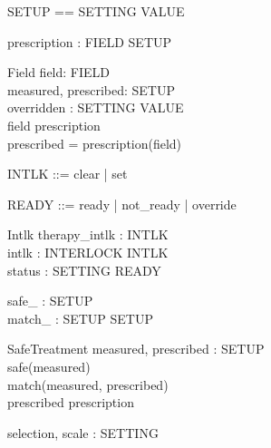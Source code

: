 
\begin{zed}
\end{zed}
\begin{zed}
SETUP == SETTING \fun VALUE
\end{zed}
\begin{axdef}
prescription : FIELD \pfun SETUP
\end{axdef}

\begin{schema}{Field}
field: FIELD \\
measured, prescribed: SETUP \\
overridden : SETTING \pfun VALUE \\
\where field \in \dom prescription \\
prescribed = prescription(field)
\end{schema}

\begin{zed}
[INTERLOCK]
\end{zed}
\begin{zed}
INTLK ::= clear | set
\end{zed}
\begin{zed}
READY ::= ready | not\_ready | override
\end{zed}

\begin{schema}{Intlk}
therapy\_intlk : INTLK \\
intlk : INTERLOCK \fun INTLK \\
status : SETTING \fun READY
\end{schema}

\begin{axdef}
safe\_ : \power SETUP \\
match\_ : SETUP \rel SETUP
\end{axdef}

\begin{schema}{SafeTreatment}
measured, prescribed : SETUP \\
\where safe(measured) \\
match(measured, prescribed) \\
prescribed \in \ran prescription
\end{schema}

\begin{axdef}
selection, scale : \power SETTING
\end{axdef}


